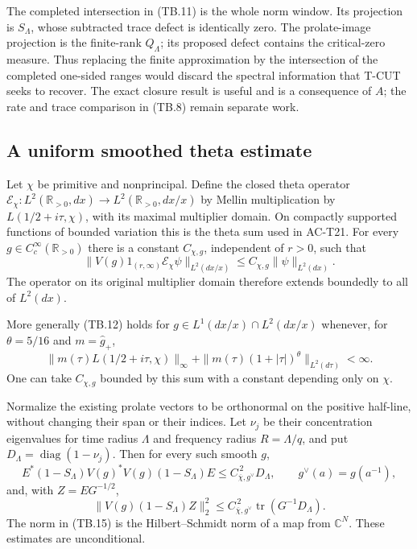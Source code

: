 The completed intersection in (TB.11) is the whole norm window.
Its projection is \(S_\Lambda\), whose subtracted trace defect
is identically zero.  The prolate-image projection is the
finite-rank \(Q_\Lambda\); its proposed defect contains the
critical-zero measure.  Thus replacing the finite approximation
by the intersection of the completed one-sided ranges would
discard the spectral information that T-CUT seeks to recover.
The exact closure result is useful and is a consequence of \(A\);
the rate and trace comparison in (TB.8) remain separate work.

\subsection{A uniform smoothed theta estimate}

\begin{lemma}
\label{AC-T25}
Let \(\chi\) be primitive and nonprincipal.  Define the closed
theta operator \(\mathcal E_\chi:L^2(\mathbb R_{>0},dx)
\longrightarrow L^2(\mathbb R_{>0},dx/x)\) by Mellin
multiplication by \(L(1/2+i\tau,\chi)\), with its maximal
multiplier domain.  On compactly supported functions of bounded
variation this is the theta sum used in AC-T21.
For every \(g\in C_c^\infty(\mathbb R_{>0})\) there is a
constant \(C_{\chi,g}\), independent of \(r>0\), such that
\[
 \|V(g)1_{(r,\infty)}\mathcal E_\chi\psi\|_{L^2(dx/x)}
       \leq C_{\chi,g}\|\psi\|_{L^2(dx)}.
 \tag{TB.12}
\]
The operator on its original multiplier domain therefore
extends boundedly to all of \(L^2(dx)\).

More generally (TB.12) holds for \(g\in L^1(dx/x)\cap
L^2(dx/x)\) whenever, for \(\theta=5/16\) and
\(m=\widehat g_+\),
\[
 \|m(\tau)L(1/2+i\tau,\chi)\|_\infty
       +\|m(\tau)(1+|\tau|)^\theta\|_{L^2(d\tau)}<\infty.
 \tag{TB.13}
\]
One can take \(C_{\chi,g}\) bounded by this sum with a
constant depending only on \(\chi\).

Normalize the existing prolate vectors to be orthonormal on
the positive half-line, without changing their span or their
indices.  Let \(\nu_j\) be their concentration eigenvalues
for time radius \(\Lambda\) and frequency radius
\(R=\Lambda/q\), and put
\(D_\Lambda=\operatorname{diag}(1-\nu_j)\).
Then for every such smooth \(g\),
\[
 E^*(1-S_\Lambda)V(g)^*V(g)(1-S_\Lambda)E
                \leq C_{\overline\chi,g^\vee}^{\,2}D_\Lambda,
 \qquad g^\vee(a)=g(a^{-1}),
 \tag{TB.14}
\]
and, with \(Z=EG^{-1/2}\),
\[
 \|V(g)(1-S_\Lambda)Z\|_2^2
       \leq C_{\overline\chi,g^\vee}^{\,2}
                       \operatorname{tr}(G^{-1}D_\Lambda).
 \tag{TB.15}
\]
The norm in (TB.15) is the Hilbert--Schmidt norm of a map
from \(\mathbb C^N\).  These estimates are unconditional.
\end{lemma}
